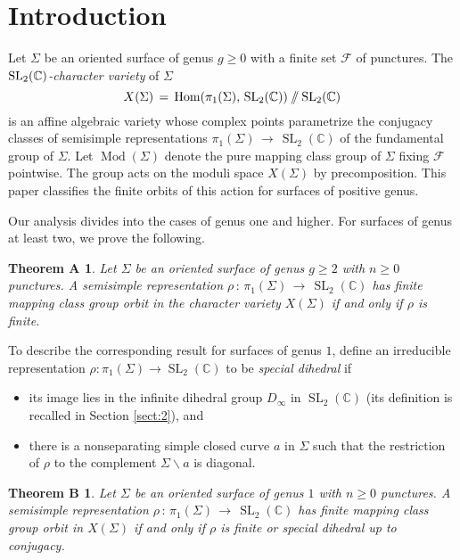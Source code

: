 \documentclass[reqno]{amsart}
\theoremstyle{plain}
\newtheorem*{theorema}{Theorem A}
\newtheorem*{theoremb}{Theorem B}
\theoremstyle{definition}
\theoremstyle{remark}
\newcommand{\C}{{\mathbb{C}}}
\newcommand{\Fcal}{{\mathcal{F}}}
\DeclareMathOperator{\Hom}{Hom}
\DeclareMathOperator{\Mod}{Mod}
\DeclareMathOperator{\SL}{SL}
\newcommand{\git}{\mathbin{
  \mathchoice{/\mkern-6mu/}%
    {/\mkern-6mu/}%
    {/\mkern-5mu/}%
    {/\mkern-5mu/}}}%
\begin{document}
\section{Introduction} \label{sect:1}

Let $\Sigma$ be an oriented surface of genus $g\geq0$ with a finite set $\Fcal$ of punctures. 
The \emph{${\rm SL}_2({\mathbb C})$-character variety} of $\Sigma$ 
$$X(\Sigma)\,=\,\Hom(\pi_1(\Sigma),\, {\rm SL}_2({\mathbb C}))\git {\rm SL}_2({\mathbb C})$$ is an 
affine algebraic variety whose complex points parametrize the conjugacy classes of semisimple 
representations $\pi_1(\Sigma)\,\to\,\SL_2(\C)$ of the fundamental group of $\Sigma$. Let 
$\Mod(\Sigma)$ denote the pure mapping class group of $\Sigma$ fixing $\Fcal$ pointwise. The 
group acts on the moduli space $X(\Sigma)$ by precomposition. This paper classifies the 
finite orbits of this action for surfaces of positive genus.

Our analysis divides into the cases of genus one and higher. For surfaces of genus at least two, we prove the following.

\begin{theorema}\label{tha}
Let $\Sigma$ be an oriented surface of genus $g\geq2$ with $n\geq 0$ punctures. A semisimple
representation $\rho\,:\,\pi_1(\Sigma)\,\to\,\SL_2(\C)$ has finite mapping class group orbit in the
character variety $X(\Sigma)$ if and only if $\rho$ is finite.
\end{theorema}

To describe the corresponding result for surfaces of genus $1$, define an irreducible 
representation $\rho:\pi_1(\Sigma)\to\SL_2(\C)$ to be \emph{special dihedral} if
\begin{itemize}
\item its image lies 
in the infinite dihedral group $D_\infty$ in $\SL_2(\C)$ (its definition is recalled in
Section \ref{sect:2}), and

\item there is a nonseparating simple closed curve $a$ in $\Sigma$ such that the restriction of 
$\rho$ to the complement $\Sigma\backslash a$ is diagonal.
\end{itemize}

\begin{theoremb}\label{thb}
Let $\Sigma$ be an oriented surface of genus $1$ with $n\geq0$ punctures. A semisimple
representation $\rho\,:\,\pi_1(\Sigma)\,\to\,\SL_2(\C)$ has finite mapping class group orbit in
$X(\Sigma)$ if and only if $\rho$ is finite or special dihedral up to conjugacy.
\end{theoremb}
\end{document}
